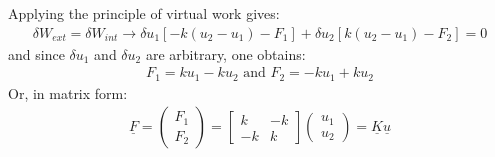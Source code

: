 Applying the principle of virtual work gives:
\begin{gather}
	\delta W_{ext} = \delta W_{int} \rightarrow \delta u_1 \left[-k\left(u_2 - u_1\right)-F_1\right] + \delta u_2 \left[k\left(u_2 - u_1\right)-F_2\right] = 0
\end{gather}
and since $\delta u_1$ and $\delta u_2$ are arbitrary, one obtains:
\begin{gather}
	F_1 = ku_1 - ku_2 \textrm{ and } F_2 = -ku_1 + ku_2
\end{gather}
Or, in matrix form:
\begin{gather}
	\underline{F} = \begin{pmatrix}
		F_1\\
		F_2
	\end{pmatrix} = \begin{bmatrix}
		k & -k\\
		-k & k
	\end{bmatrix}\begin{pmatrix}
		u_1\\
		u_2
	\end{pmatrix} = \underline{K}\underline{u}
\end{gather}